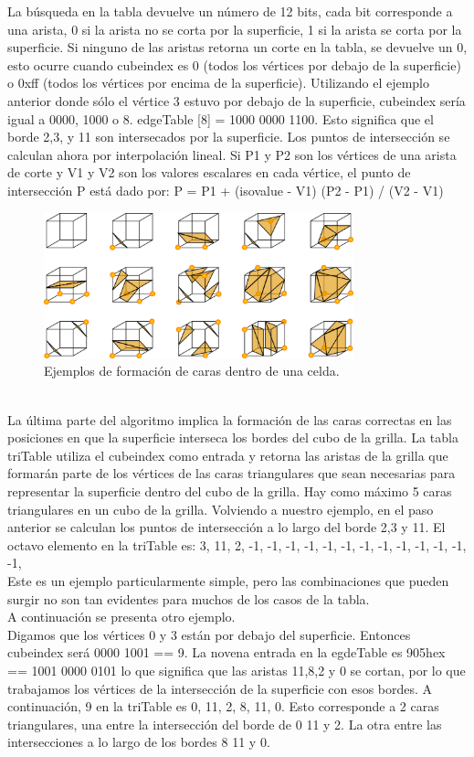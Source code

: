 \documentclass[12pt]{article}
\begin{document}
La búsqueda en la tabla devuelve un número de 12 bits, cada bit corresponde a una arista, 0 si la arista no se corta por la superficie, 1 si la arista se corta por la superficie. Si ninguno de las aristas retorna un corte en la tabla, se devuelve un 0, esto ocurre cuando cubeindex es 0 (todos los vértices por debajo de la superficie) o 0xff (todos los vértices por encima de la superficie).
Utilizando el ejemplo anterior donde sólo el vértice 3 estuvo por debajo de la superficie, cubeindex sería igual a 0000, 1000 o 8. edgeTable [8] = 1000 0000 1100. Esto significa que el borde 2,3, y 11 son intersecados por la superficie.
Los puntos de intersección se calculan ahora por interpolación lineal. Si P1 y P2 son los vértices de una arista de corte y V1 y V2 son los valores escalares en cada vértice, el punto de intersección P está dado por:
P = P1 + (isovalue - V1) (P2 - P1) / (V2 - V1)
\begin{figure}[h!]
\includegraphics[width=0.8\textwidth,center]{marchingcubes3.png}
\caption{Ejemplos de formación de caras dentro de una celda.}
\end{figure}
\\La última parte del algoritmo implica la formación de las caras correctas en las posiciones en que la superficie interseca los bordes del cubo de la grilla. La tabla triTable utiliza el cubeindex como entrada y retorna las aristas de la grilla que  formarán parte de los vértices de las caras triangulares que sean necesarias para representar la superficie dentro del cubo de la grilla. Hay como máximo 5 caras triangulares en un cubo de la grilla.
Volviendo a nuestro ejemplo, en el paso anterior se calculan los puntos de intersección a lo largo del borde 2,3 y 11. El octavo elemento en la triTable es:
{3, 11, 2, -1, -1, -1, -1, -1, -1, -1, -1, -1, -1, -1, -1, -1},
\\Este es un ejemplo particularmente simple, pero las combinaciones que pueden surgir no son tan evidentes para muchos de los casos de la tabla.
\\A continuación se presenta otro ejemplo.
\\Digamos que los vértices 0 y 3 están por debajo del superficie. Entonces cubeindex será 0000 1001 == 9. La novena entrada en la egdeTable es 905hex == 1001 0000 0101 lo que significa que las aristas 11,8,2 y 0 se cortan, por lo que trabajamos los vértices de la intersección de la superficie con esos bordes.
A continuación, 9 en la triTable es 0, 11, 2, 8, 11, 0. Esto corresponde a 2 caras triangulares, una entre la intersección del borde de 0 11 y 2. La otra entre las intersecciones a lo largo de los bordes 8 11 y 0.
\end{document}
